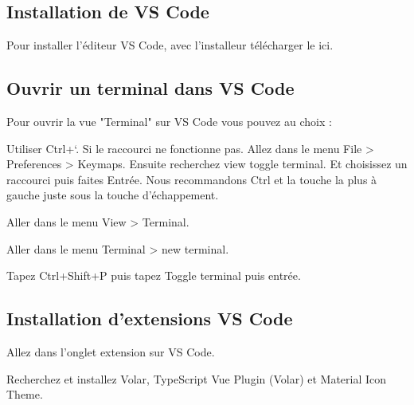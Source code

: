 \documentclass{article}
\begin{document}
\subsection{Installation de VS Code}
Pour installer l'éditeur VS Code, avec l'installeur télécharger le ici.

\subsection{Ouvrir un terminal dans VS Code}
Pour ouvrir la vue "Terminal" sur VS Code vous pouvez au choix :

Utiliser Ctrl+`. Si le raccourci ne fonctionne pas. Allez dans le menu File > Preferences > Keymaps. Ensuite recherchez view toggle terminal. Et choisissez un raccourci puis faites Entrée. Nous recommandons Ctrl et la touche la plus à gauche juste sous la touche d'échappement.

Aller dans le menu View > Terminal.

Aller dans le menu Terminal > new terminal.

Tapez Ctrl+Shift+P puis tapez Toggle terminal puis entrée.

\subsection{Installation d'extensions VS Code}
Allez dans l'onglet extension sur VS Code.

Recherchez et installez Volar, TypeScript Vue Plugin (Volar) et Material Icon Theme.
\end{document}
